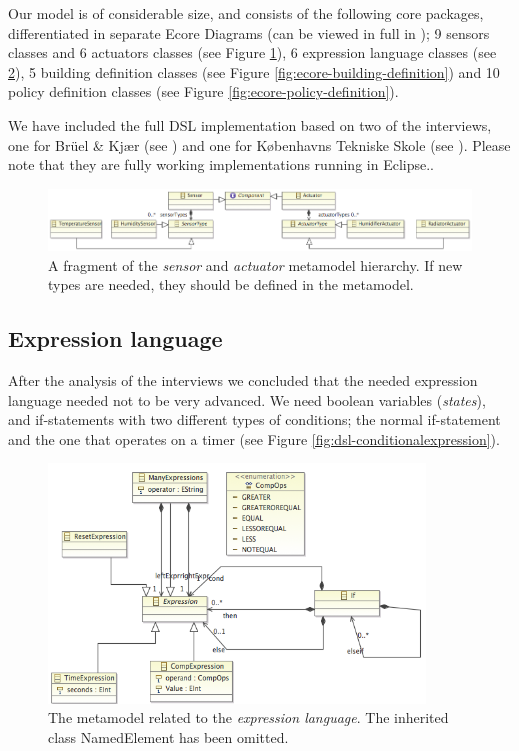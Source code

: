 \documentclass{llncs}
\begin{document}
Our model is of considerable size, and consists of the following core packages, differentiated in separate Ecore Diagrams (can be viewed in full in ); 9 sensors classes and 6 actuators classes (see Figure \ref{fig:ecore-sensors-actuators}), 6 expression language classes (see \ref{fig:ecore-expression-language}), 5 building definition classes (see Figure \ref{fig:ecore-building-definition}) and 10 policy definition classes (see Figure \ref{fig:ecore-policy-definition}).

We have included the full DSL implementation based on two of the interviews, one for Br\"{u}el \& Kj\ae r (see  ) and one for K\o benhavns Tekniske Skole (see ). Please note that they are fully working implementations running in Eclipse..

\begin{figure}[h]
	\centering
    \includegraphics[scale=0.37]{ecore-sensors-actuators.png} 
	\caption{A fragment of the \textit{sensor} and \textit{actuator} metamodel hierarchy. If new types are needed, they should be defined in the metamodel.}
	\label{fig:ecore-sensors-actuators}
\end{figure}

\subsection{Expression language}
After the analysis of the interviews we concluded that the needed expression language needed not to be very advanced. We need boolean variables (\textit{states}), and if-statements with two different types of conditions; the normal if-statement and the one that operates on a timer (see Figure \ref{fig:dsl-conditionalexpression}). 

\begin{figure}[h]
  \centering
    \includegraphics[width=10cm]{ecore-expression-language.png} 
	\caption{The metamodel related to the \textit{expression language}. The inherited class NamedElement has been omitted.}
	\label{fig:ecore-expression-language}
\end{figure}
\end{document}
